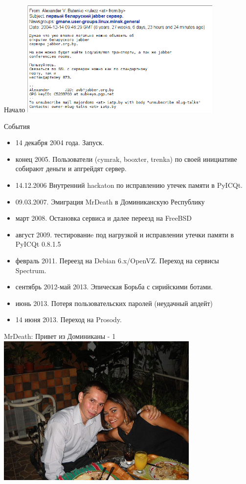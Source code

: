 \begin{frame}{Начало}
\includegraphics[width=10cm]{beginning}
\end{frame}

\begin{frame}{События}

  \begin{itemize}
    \item 14 декабря 2004 года. Запуск.
    \item конец 2005. Пользователи (cymrak, booxter, trenka) по своей инициативе собирают деньги и апгрейдят сервер.
    \item 14.12.2006 Внутренний hackaton по исправлению утечек памяти в PyICQt.  
    \item 09.03.2007. Эмиграция MrDeath в Доминиканскую Республику
    \item март 2008. Остановка сервиса и далее переезд на FreeBSD
    \item август 2009. тестированиe под нагрузкой и исправлении утечки памяти в PyICQt 0.8.1.5
    \item февраль 2011. Переезд на Debian 6.x/OpenVZ. Переход на сервисы Spectrum.
    \item сентябрь 2012-май 2013. Эпическая Борьба с сирийскими ботами.
    \item июнь 2013. Потеря пользовательских паролей (неудачный апдейт)
    \item 14 июня 2013. Переход на Prosody.
  \end{itemize}

\end{frame}

\begin{frame}{MrDeath: Привет из Доминиканы - 1}
  \includegraphics[width=10cm]{avb_with_Karla}
\end{frame}

